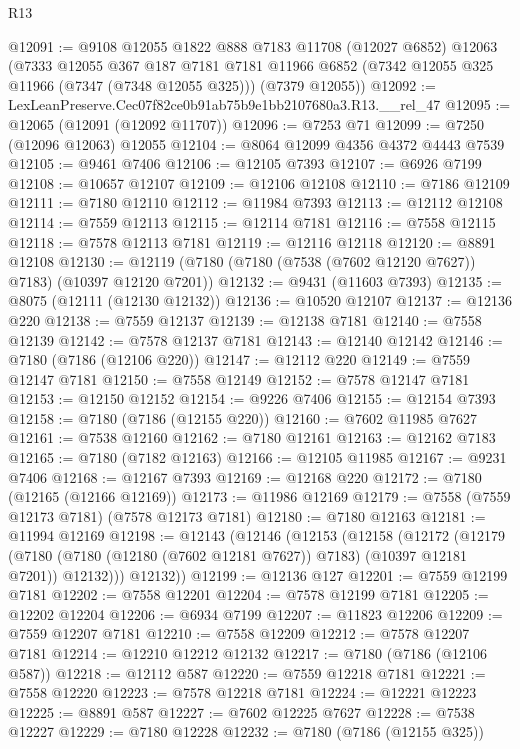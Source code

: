 \begin{lexlean}{R13}
\begin{coremodule}
@12091 := @9108
    @12055
    @1822
    @888
    @7183
    @11708
    (@12027 @6852)
    @12063
    (@7333
      @12055
      @367
      @187
      @7181
      @7181
      @11966
      @6852
      (@7342 @12055 @325 @11966 (@7347 (@7348 @12055 @325)))
      (@7379 @12055))
@12092 := LexLeanPreserve.Cec07f82ce0b91ab75b9e1bb2107680a3.R13.__rel_47
@12095 := @12065 (@12091 (@12092 @11707))
@12096 := @7253 @71
@12099 := @7250 (@12096 @12063) @12055
@12104 := @8064 @12099 @4356 @4372 @4443 @7539
@12105 := @9461 @7406
@12106 := @12105 @7393
@12107 := @6926 @7199
@12108 := @10657 @12107
@12109 := @12106 @12108
@12110 := @7186 @12109
@12111 := @7180 @12110
@12112 := @11984 @7393
@12113 := @12112 @12108
@12114 := @7559 @12113
@12115 := @12114 @7181
@12116 := @7558 @12115
@12118 := @7578 @12113 @7181
@12119 := @12116 @12118
@12120 := @8891 @12108
@12130 := @12119 (@7180 (@7180 (@7538 (@7602 @12120 @7627)) @7183) (@10397 @12120 @7201))
@12132 := @9431 (@11603 @7393)
@12135 := @8075 (@12111 (@12130 @12132))
@12136 := @10520 @12107
@12137 := @12136 @220
@12138 := @7559 @12137
@12139 := @12138 @7181
@12140 := @7558 @12139
@12142 := @7578 @12137 @7181
@12143 := @12140 @12142
@12146 := @7180 (@7186 (@12106 @220))
@12147 := @12112 @220
@12149 := @7559 @12147 @7181
@12150 := @7558 @12149
@12152 := @7578 @12147 @7181
@12153 := @12150 @12152
@12154 := @9226 @7406
@12155 := @12154 @7393
@12158 := @7180 (@7186 (@12155 @220))
@12160 := @7602 @11985 @7627
@12161 := @7538 @12160
@12162 := @7180 @12161
@12163 := @12162 @7183
@12165 := @7180 (@7182 @12163)
@12166 := @12105 @11985
@12167 := @9231 @7406
@12168 := @12167 @7393
@12169 := @12168 @220
@12172 := @7180 (@12165 (@12166 @12169))
@12173 := @11986 @12169
@12179 := @7558 (@7559 @12173 @7181) (@7578 @12173 @7181)
@12180 := @7180 @12163
@12181 := @11994 @12169
@12198 := @12143
    (@12146
      (@12153
        (@12158
          (@12172
            (@12179
              (@7180 (@7180 (@12180 (@7602 @12181 @7627)) @7183) (@10397 @12181 @7201))
              @12132)))
        @12132))
@12199 := @12136 @127
@12201 := @7559 @12199 @7181
@12202 := @7558 @12201
@12204 := @7578 @12199 @7181
@12205 := @12202 @12204
@12206 := @6934 @7199
@12207 := @11823 @12206
@12209 := @7559 @12207 @7181
@12210 := @7558 @12209
@12212 := @7578 @12207 @7181
@12214 := @12210 @12212 @12132
@12217 := @7180 (@7186 (@12106 @587))
@12218 := @12112 @587
@12220 := @7559 @12218 @7181
@12221 := @7558 @12220
@12223 := @7578 @12218 @7181
@12224 := @12221 @12223
@12225 := @8891 @587
@12227 := @7602 @12225 @7627
@12228 := @7538 @12227
@12229 := @7180 @12228
@12232 := @7180 (@7186 (@12155 @325))

\end{coremodule}
\end{lexlean}
